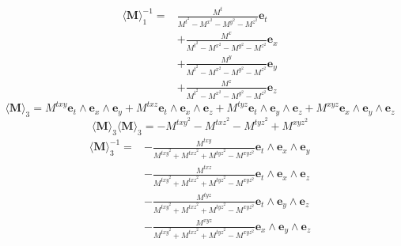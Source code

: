 \documentclass[10pt,fleqn]{report}
\begin{document}
  \begin{align*} \langle \bm{M} \rangle _1 ^{-1} =  & \frac{M^{t} }{M^{t} ^2 - M^{x} ^2 - M^{y} ^2 - M^{z} ^2} \boldsymbol{e}_{t} \\  &  + \frac{M^{x} }{M^{t} ^2 - M^{x} ^2 - M^{y} ^2 - M^{z} ^2} \boldsymbol{e}_{x} \\  &  + \frac{M^{y} }{M^{t} ^2 - M^{x} ^2 - M^{y} ^2 - M^{z} ^2} \boldsymbol{e}_{y} \\  &  + \frac{M^{z} }{M^{t} ^2 - M^{x} ^2 - M^{y} ^2 - M^{z} ^2} \boldsymbol{e}_{z}  \end{align*} 
\begin{equation*} \langle \bm{M} \rangle _3 = M^{txy}  \boldsymbol{e}_{t}\wedge \boldsymbol{e}_{x}\wedge \boldsymbol{e}_{y} + M^{txz}  \boldsymbol{e}_{t}\wedge \boldsymbol{e}_{x}\wedge \boldsymbol{e}_{z} + M^{tyz}  \boldsymbol{e}_{t}\wedge \boldsymbol{e}_{y}\wedge \boldsymbol{e}_{z} + M^{xyz}  \boldsymbol{e}_{x}\wedge \boldsymbol{e}_{y}\wedge \boldsymbol{e}_{z} \end{equation*}
\begin{equation*} \langle \bm{M} \rangle _3 \langle \bm{M} \rangle _3 = - M^{txy} ^2 - M^{txz} ^2 - M^{tyz} ^2 + M^{xyz} ^2 \end{equation*}
  \begin{align*} \langle \bm{M} \rangle _3^{-1} =  & - \frac{M^{txy} }{M^{txy} ^2 + M^{txz} ^2 + M^{tyz} ^2 - M^{xyz} ^2} \boldsymbol{e}_{t}\wedge \boldsymbol{e}_{x}\wedge \boldsymbol{e}_{y} \\  &  - \frac{M^{txz} }{M^{txy} ^2 + M^{txz} ^2 + M^{tyz} ^2 - M^{xyz} ^2} \boldsymbol{e}_{t}\wedge \boldsymbol{e}_{x}\wedge \boldsymbol{e}_{z} \\  &  - \frac{M^{tyz} }{M^{txy} ^2 + M^{txz} ^2 + M^{tyz} ^2 - M^{xyz} ^2} \boldsymbol{e}_{t}\wedge \boldsymbol{e}_{y}\wedge \boldsymbol{e}_{z} \\  &  - \frac{M^{xyz} }{M^{txy} ^2 + M^{txz} ^2 + M^{tyz} ^2 - M^{xyz} ^2} \boldsymbol{e}_{x}\wedge \boldsymbol{e}_{y}\wedge \boldsymbol{e}_{z}  \end{align*} 
\end{document}
